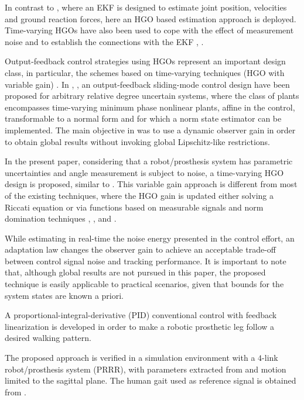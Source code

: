 \documentclass[letterpaper, 10 pt, conference]{ieeeconf}  %
\theoremstyle{plain}
\theoremstyle{definition}
\theoremstyle{remark}
\begin{document}
In contrast to \cite{Fakoorian2016}, where an EKF is designed to estimate joint position, velocities and ground reaction forces, here an HGO based estimation approach is deployed. Time-varying HGOs have also been used to cope with the effect of measurement noise and to establish the connections with the EKF \cite{AK:07}, \cite{Khalil2009}. 

Output-feedback control strategies using HGOs \cite{OK:97} represent an important design class, in particular, the schemes based on time-varying techniques (HGO with variable gain) \cite{P:01}\cite{KKJ:02} \cite{KKC:03}\cite{LL:05}\cite{AK:07}. In \cite{POH:2011}, \cite{PHCL:2007}, an output-feedback sliding-mode control design have been proposed for arbitrary relative degree uncertain systems, where the class of plants encompasses time-varying minimum phase nonlinear plants, affine in the control, transformable to a normal form and for which a norm state estimator can be implemented. The main objective in \cite{POH:2011} was to use a dynamic observer gain in order to obtain global results without invoking global Lipschitz-like restrictions. 

In the present paper, considering that a robot/prosthesis system has parametric uncertainties and angle measurement is subject to noise, a time-varying HGO design is proposed, similar to \cite{POH:2011}. This variable gain approach is different from most of the existing techniques,
where the HGO gain is updated either solving a Riccati equation \cite{P:01}\cite{P:07}\cite{GAL:06} or via functions based on measurable signals and norm domination techniques \cite{LL:05}, \cite{P:07}, \cite{APA:09} and \cite{POH:2011}.

While estimating in real-time the noise energy presented in the control effort, an adaptation law changes the observer gain to achieve an acceptable trade-off between control signal noise and tracking performance. It is important to note that, although global results are not pursued in this paper, the proposed technique is easily applicable to practical scenarios, given that bounds for the system states are known a priori.

A proportional-integral-derivative (PID) conventional control with feedback linearization is developed in order to make a robotic prosthetic leg follow a desired walking pattern. 

The proposed approach is verified in a simulation environment with a $4$-link robot/prosthesis system (PRRR), with parameters extracted from \cite{Richter2015} and motion limited to the sagittal plane. The human gait used as reference signal is obtained from \cite{Schwartz2008}.
\end{document}
